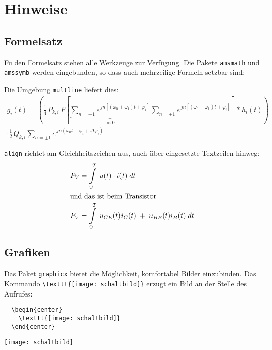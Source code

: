 \section{Hinweise}

\subsection{Formelsatz}
Fu den Formelsatz stehen alle  Werkzeuge zur Verfügung. Die Pakete \texttt{amsmath}
und \texttt{amssymb}  werden eingebunden, so dass auch  mehrzeilige Formeln setzbar
sind:

Die Umgebung \texttt{multline} liefert dies:
\begin{multline}
        g_i(t) = \left( \frac 1 4 \,P_{k,i}\,F \left[ \underbrace{
                \sum_{n=\pm 1} e^{\,jn[(\omega_0+\omega_1)t + \varphi_i]} }_{\approx 0}
                \sum_{n=\pm 1} e^{\,jn[(\omega_0-\omega_1)t + \varphi_i]} \right] 
                \ast h_i(t) \right) 
                \\ \cdot
                \frac 1 2 \,Q_{k,i} \sum_{n=\pm 1} 
                 e^{\,jn(\omega_0 t + \varphi_i + \Delta\varphi_i)}
\end{multline}

\texttt{align} richtet am Gleichheitszeichen aus, auch über eingesetzte Textzeilen
hinweg: 
\begin{align}
    P_V &= \int\limits_0^T\;u(t)\cdot i(t)\;dt\\
\intertext{und das ist beim Transistor}
    P_V &= \int\limits_0^T \; u_{CE}(t)i_C(t)\;+\; u_{BE}(t)i_B(t)\;dt
\end{align}

\subsection{Grafiken}
Das   Paket   \texttt{graphicx}   bietet   die  Möglichkeit,   komfortabel   Bilder
einzubinden.  Das Kommando \verb|\texttt{[image: schaltbild]}|  erzugt ein
Bild an der Stelle des Aufrufes:

\begin{lstlisting}
  \begin{center}
    \texttt{[image: schaltbild]}
  \end{center}
\end{lstlisting}

\begin{center}
  \texttt{[image: schaltbild]}
\end{center}

